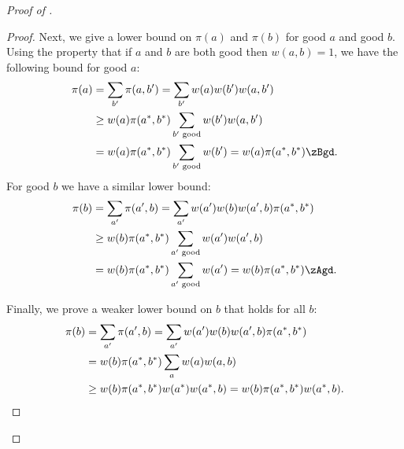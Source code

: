 \begin{proof}[Proof of ]
\begin{proof}
 Next, we give a lower bound on $\pi(a)$ and 
$\pi(b)$ for good $a$ and good $b$.  Using the property that if $a$ and 
$b$ are both good then $w(a,b) = 1$, we have the following bound for 
good $a$:
\begin{align*}
\pi(a) &=  \sum_{b'}\pi(a,b') = \sum_{b'} w(a)w(b') w(a,b')\\
&\geq w(a) \pi(a^*,b^*) \sum_{b' \text{ good}} w(b')w(a,b')\\
&= w(a) \pi(a^*,b^*) \sum_{b' \text{ good}} w(b') = w(a) \pi(a^*,b^*)\zBgd.\\
\end{align*}
\noindent For good $b$ we have a similar lower bound: 
\begin{align*}
\pi(b) &=  \sum_{a'}\pi(a',b) = \sum_{a'} w(a')w(b) w(a',b)\pi(a^*,b^*)\\
&\geq w(b) \pi(a^*,b^*) \sum_{a' \text{ good}} w(a')w(a',b)\\
&= w(b) \pi(a^*,b^*) \sum_{a' \text{ good}} w(a') = w(b) \pi(a^*,b^*)\zAgd.\\
\end{align*}



 Finally, we prove a weaker lower bound on $b$ that 
holds for all $b$:
\begin{align*}
\pi(b) &= \sum_{a'}\pi(a',b) = \sum_{a'} w(a')w(b) w(a',b)\pi(a^*,b^*)\\
&= w(b)\pi(a^*,b^*) \sum_a w(a)w(a,b)\\
&\geq w(b)\pi(a^*,b^*) w(a^*)w(a^*,b) = w(b)\pi(a^*,b^*)w(a^*,b).\qedhere
\end{align*}
\end{proof}


\end{proof}
